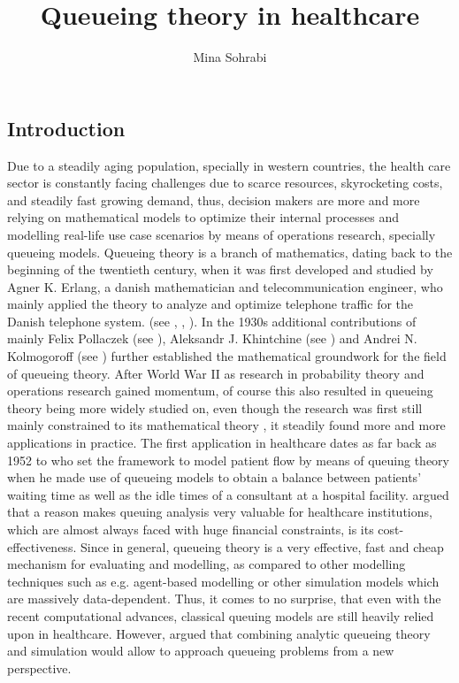 \documentclass[11pt,a4paper]{article}
\date{}
\begin{document}
\title{Queueing theory in healthcare}
\author{Mina Sohrabi}
\maketitle
\tableofcontents
\newpage
\begin{spacing}{1.8}

\subsection{Introduction}
Due to a steadily aging population, specially in western countries, the health care sector is constantly facing challenges due to scarce resources, skyrocketing costs,  and steadily fast growing demand, thus, decision makers are more and more relying on mathematical models to optimize their internal processes and modelling real-life use case scenarios by means of operations research, specially queueing models. Queueing theory is a branch of mathematics, dating back to the beginning of the twentieth century, when it was  first developed and studied by Agner K. Erlang, a danish mathematician and telecommunication engineer, who mainly applied the theory to analyze and optimize telephone traffic for the Danish telephone system. 
(see \citep{Erlang1909}, \citep{Erlang1925}, \citep{Erlang1948}). In the 1930s additional contributions of mainly Felix Pollaczek (see \citep{Pollaczek1930} \citep{Pollaczek1931}), Aleksandr J. Khintchine (see \citep{Khintchine1932}) and Andrei N. Kolmogoroff (see \citep{Kolmogoroff1931}) further established the mathematical groundwork for the  field of queueing theory.
After World War II as research in probability theory and operations research gained momentum, of course this also resulted in queueing theory being more widely studied on, even though the research was first still  mainly constrained to its mathematical theory \citep{Newell2013}, it steadily found more and more applications in practice. The first application  in healthcare dates as far back as 1952 to \citet{Bailey1952} who set the framework to model patient flow by means of queuing theory when he made use of queueing models to obtain a balance between patients' waiting time as well as the idle times of a consultant at a hospital facility. \citet{Green2006} argued that a reason makes queuing analysis very valuable for healthcare institutions, which are almost always faced with huge financial constraints,  is its cost-effectiveness. Since in general, queueing theory is a very effective, fast and cheap mechanism for evaluating and modelling, as compared to other modelling techniques such as e.g.  agent-based modelling or other simulation models which are massively data-dependent. Thus, it comes to no surprise, that even with the recent computational advances, classical queuing models are still heavily relied upon in healthcare.
However, \citet{Lakshmi2013} argued that combining analytic queueing theory and simulation would allow to approach queueing problems from a new perspective.


\end{spacing}
\end{document}
